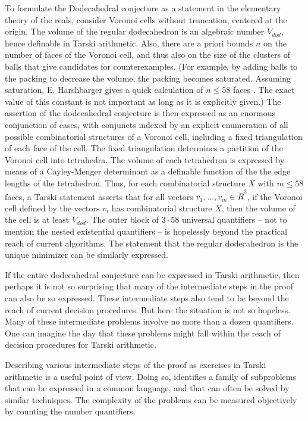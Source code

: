 To formulate the Dodecahedral conjecture as a statement in the
elementary theory of the reals, consider Voronoi cells without
truncation, centered at the origin.  The
volume of the regular dodecahedron is an algebraic number $V_{dod}$,
hence definable in Tarski arithmetic.  Also, there are
a priori bounds $n$ on the number of faces of the Voronoi cell, and thus also
on the size of the clusters of balls that give candidates for counterexamples. (For example, by adding balls to the packing to decrease the volume, 
the  packing becomes saturated.  Assuming saturation, E. Harshbarger gives a quick calculation of $n\le58$ faces \cite{Har}. The exact value of this constant is not important as long as it is explicitly given.)
The assertion of the dodecahedral conjecture is then expressed as an enormous conjunction
of cases, with conjuncts indexed by an explicit enumeration of all possible combinatorial structures of a Voronoi cell, including a fixed triangulation of each face of the cell.  The fixed triangulation determines
a partition of the Voronoi cell into tetrahedra.  The volume of each tetrahedron is expressed by means of a Cayley-Menger determinant as a definable function of the the edge lengths of the tetrahedron.  Thus, for each combinatorial structure $X$ with $m\le 58$ faces, a Tarski statement asserts that
for all vectors $v_1,\ldots,v_m\in\ring{R}^3$, if the Voronoi cell defined by the vectors $v_i$ has combinatorial structure $X$, then the volume of the cell is at least $V_{dod}$.  The outer block of $3\cdot 58$ universal quantifiers -- not to mention the nested existential quantifiers -- is hopelessly beyond the practical reach of current algorithms.  The statement that the regular dodecahedron is the unique minimizer can be similarly expressed.

If the entire dodecahedral conjecture can be expressed
in Tarski arithmetic, then perhaps it is not so surprising that
many of the intermediate steps in the proof can also be so expressed.
These intermediate steps also tend to be beyond the reach of
current decision procedures.  
But here the situation is not so hopeless.  Many of these
intermediate problems involve no more than a dozen quantifiers.
One can imagine the day that these problems might fall within the
reach of decision procedures for Tarski arithmetic.

Describing various intermediate steps 
of the proof as exercises
in Tarski arithmetic is a useful point of view.  Doing so, identifies
a family of subproblems that can be expressed in a common language,
and that can often be solved by similar techniques.  
The complexity of the
problems can be measured objectively by counting the number
quantifiers.

